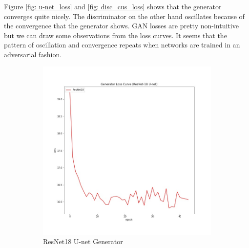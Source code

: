 \documentclass[oneside,a4paper,12pt]{report}
\begin{document}
Figure \ref{fig: u-net_loss} and \ref{fig: disc_cus_loss} shows that the generator converges quite nicely. The discriminator on the other hand oscillates because of the convergence that the generator shows. GAN losses are pretty non-intuitive but we can draw some observations from the loss curves. It seems that the pattern of oscillation and convergence repeats when networks are trained in an adversarial fashion. 

\begin{figure}[!htb]
	\centering
	\begin{subfigure}[b]{0.3\textwidth}
		\centering
		\includegraphics[width=\textwidth]{figures/resnet18_generator_loss}
		\caption{ResNet18 U-net Generator}
		\label{fig: resnet_loss}
	\end{subfigure}
		\hspace{0.1 in}
	\begin{subfigure}[b]{0.3\textwidth}
		\centering

\end{subfigure}
\end{figure}
\end{document}

